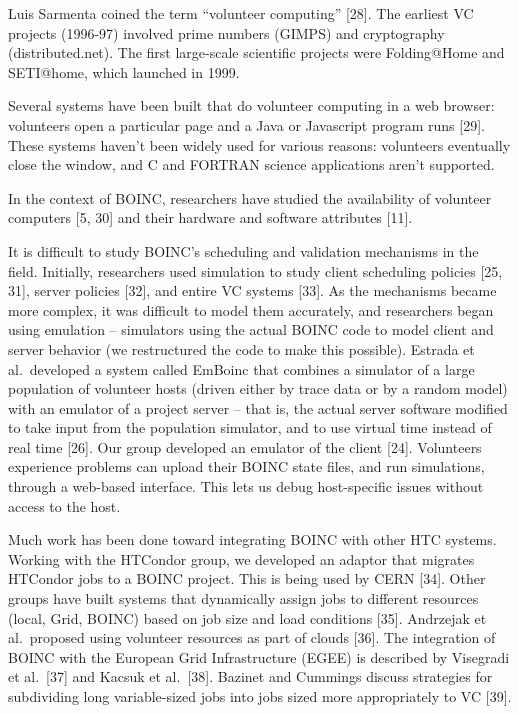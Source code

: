 \documentclass[
]{article}
\begin{document}
Luis Sarmenta coined the term ``volunteer computing'' {[}28{]}. The
earliest VC projects (1996-97) involved prime numbers (GIMPS) and
cryptography (distributed.net). The first large-scale scientific
projects were Folding@Home and SETI@home, which launched in 1999.

Several systems have been built that do volunteer computing in a web
browser: volunteers open a particular page and a Java or Javascript
program runs {[}29{]}. These systems haven't been widely used for
various reasons: volunteers eventually close the window, and C and
FORTRAN science applications aren't supported.

In the context of BOINC, researchers have studied the availability of
volunteer computers {[}5, 30{]} and their hardware and software
attributes {[}11{]}.

It is difficult to study BOINC's scheduling and validation mechanisms in
the field. Initially, researchers used simulation to study client
scheduling policies {[}25, 31{]}, server policies {[}32{]}, and entire
VC systems {[}33{]}. As the mechanisms became more complex, it was
difficult to model them accurately, and researchers began using
emulation -- simulators using the actual BOINC code to model client and
server behavior (we restructured the code to make this possible).
Estrada et al.~developed a system called EmBoinc that combines a
simulator of a large population of volunteer hosts (driven either by
trace data or by a random model) with an emulator of a project server --
that is, the actual server software modified to take input from the
population simulator, and to use virtual time instead of real time
{[}26{]}. Our group developed an emulator of the client {[}24{]}.
Volunteers experience problems can upload their BOINC state files, and
run simulations, through a web-based interface. This lets us debug
host-specific issues without access to the host.

Much work has been done toward integrating BOINC with other HTC systems.
Working with the HTCondor group, we developed an adaptor that migrates
HTCondor jobs to a BOINC project. This is being used by CERN {[}34{]}.
Other groups have built systems that dynamically assign jobs to
different resources (local, Grid, BOINC) based on job size and load
conditions {[}35{]}. Andrzejak et al.~proposed using volunteer resources
as part of clouds {[}36{]}. The integration of BOINC with the European
Grid Infrastructure (EGEE) is described by Visegradi et al.~{[}37{]} and
Kacsuk et al.~{[}38{]}. Bazinet and Cummings discuss strategies for
subdividing long variable-sized jobs into jobs sized more appropriately
to VC {[}39{]}.
\end{document}
